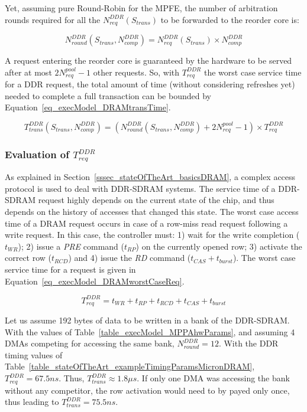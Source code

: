\documentclass[main.tex]{subfiles}
\begin{document}
Yet, assuming pure Round-Robin for the MPFE, the number of arbitration rounds required for all the $N_{req}^{DDR}(S_{trans})$ to be forwarded to the reorder core is: 

\begin{displaymath}
    N_{round}^{DDR}(S_{trans}, N_{comp}^{DDR}) = N_{req}^{DDR}(S_{trans}) \times N_{comp}^{DDR}
\end{displaymath}


A request entering the reorder core is guaranteed by the hardware to be served after at most $2 N_{req}^{pool} -1$ other requests. So, with $T_{req}^{DDR}$ the worst case service time for a DDR request, the total amount of time (without considering refreshes yet) needed to complete a full transaction can be bounded by Equation~\ref{eq_execModel_DRAMtransTime}.


\begin{equation}
    T_{trans}^{DDR} (S_{trans}, N_{comp}^{DDR}) = 
    (N_{round}^{DDR}(S_{trans}, N_{comp}^{DDR}) + 2 N_{req}^{pool} -1) \times T_{req}^{DDR}
    \label{eq_execModel_DRAMtransTime}
\end{equation}


\subsubsection{Evaluation of $T_{req}^{DDR}$}
As explained in Section~\ref{sssec_stateOfTheArt_basicsDRAM}, a complex access protocol is used to deal with DDR-SDRAM systems. The service time of a DDR-SDRAM request highly depends on the current state of the chip, and thus depends on the history of accesses that changed this state. The worst case access time of a DRAM request occurs in case of a row-miss read request following a write request. In this case, the controller must: 1) wait for the write completion ($t_{WR}$); 2) issue a \emph{PRE} command ($t_{RP}$) on the currently opened row; 3) activate the correct row ($t_{RCD}$) and 4) issue the \emph{RD} command ($t_{CAS} + t_{burst}$). The worst case service time for a request is given in Equation~\ref{eq_execModel_DRAMworstCaseReq}.

\begin{equation}
    T_{req}^{DDR} = 
    t_{WR} +
    t_{RP} +
    t_{RCD} +
    t_{CAS} +
    t_{burst}
    \label{eq_execModel_DRAMworstCaseReq}
\end{equation}


\begin{example}
    \label{ex_execModel_costAccessDDR}
    Let us assume 192 bytes of data to be written in a bank of the DDR-SDRAM. With the values of Table~\ref{table_execModel_MPPAhwParams}, and assuming 4 DMAs competing for accessing the same bank, $N_{round}^{DDR} = 12$. With the DDR timing values of Table~\ref{table_stateOfTheArt_exampleTimingParamsMicronDRAM}, $T_{req}^{DDR} = 67.5ns$. Thus, $T_{trans}^{DDR} \approx 1.8 \mu s$. If only one DMA was accessing the bank without any competitor, the row activation would need to by payed only once, thus leading to $T_{trans}^{DDR} = 75.5ns$.
\end{example}
\end{document}
